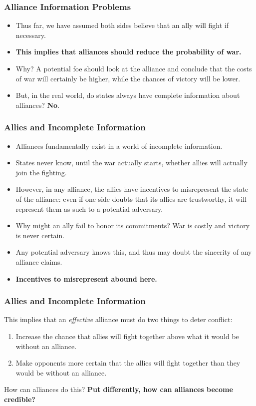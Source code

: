 \documentclass{beamer}
\begin{document}
\begin{frame} 
\frametitle{\LARGE{Alliance Information Problems}}
	\begin{itemize}
		\item Thus far, we have assumed both sides believe that an ally will fight if necessary. \pause
		\item \textbf{This implies that alliances should reduce the probability of war.} \pause
		\item Why? A potential foe should look at the alliance and conclude that the costs of war will certainly be higher, while the chances of victory will be lower. \pause
		\item But, in the real world, do states always have complete information about alliances? \pause \textbf{No}. 
	\end{itemize}
\end{frame}

\begin{frame} 
	\frametitle{\LARGE{Allies and Incomplete Information}}
	\begin{itemize}
		\item Alliances fundamentally exist in a world of incomplete information. \pause
		\item States never know, until the war actually starts, whether allies will actually join the fighting. \pause
		\item However, in any alliance, the allies have incentives to misrepresent the state of the alliance: even if one side doubts that its allies are trustworthy, it will represent them as such to a potential adversary. \pause
		\item Why might an ally fail to honor its commitments? War is costly and victory is never certain. \pause
		\item Any potential adversary knows this, and thus may doubt the sincerity of any alliance claims.
		\item \textbf{Incentives to misrepresent abound here.}
	\end{itemize}
\end{frame}

\begin{frame} 
	\frametitle{\LARGE{Allies and Incomplete Information}}
This implies that an \textit{effective} alliance must do two things to deter conflict:
\begin{enumerate}
	\item Increase the chance that allies will fight together above what it would be without an alliance. \pause 
	\item Make opponents more certain that the allies will fight together than they would be without an alliance.
\end{enumerate}
How can alliances do this? \textbf{Put differently, how can alliances become credible?}
\end{frame}
\end{document}
